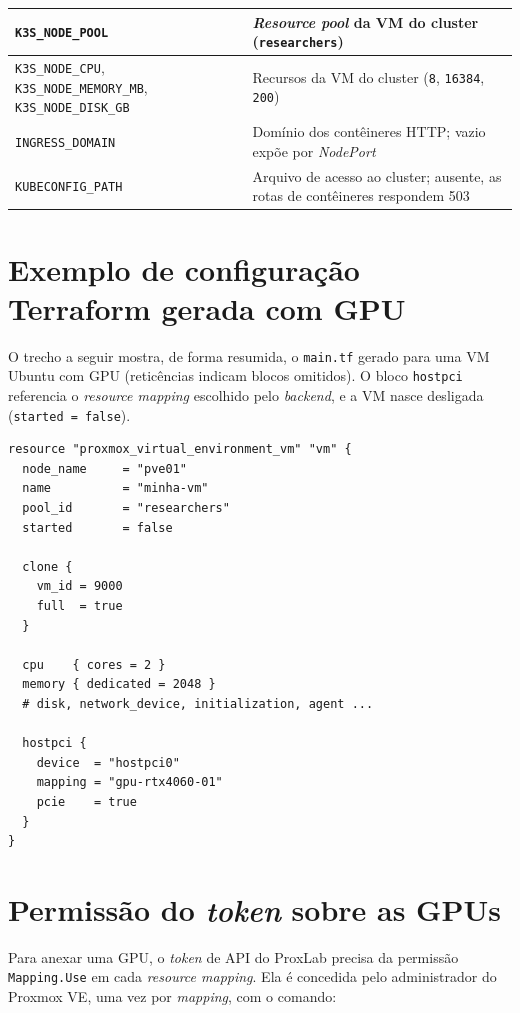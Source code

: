 \begin{longtable}{|p{6.2cm}|p{8.4cm}|}
    \texttt{K3S\_NODE\_POOL} & \textit{Resource pool} da VM do cluster (\texttt{researchers}) \\ \hline
    \texttt{K3S\_NODE\_CPU}, \texttt{K3S\_NODE\_MEMORY\_MB}, \texttt{K3S\_NODE\_DISK\_GB} & Recursos da VM do cluster (\texttt{8}, \texttt{16384}, \texttt{200}) \\ \hline
    \texttt{INGRESS\_DOMAIN} & Domínio dos contêineres HTTP; vazio expõe por \textit{NodePort} \\ \hline
    \texttt{KUBECONFIG\_PATH} & Arquivo de acesso ao cluster; ausente, as rotas de contêineres respondem 503 \\ \hline
\end{longtable}

\section{Exemplo de configuração Terraform gerada com GPU}

O trecho a seguir mostra, de forma resumida, o \texttt{main.tf} gerado para uma VM Ubuntu com GPU (reticências indicam blocos omitidos). O bloco \texttt{hostpci} referencia o \textit{resource mapping} escolhido pelo \textit{backend}, e a VM nasce desligada (\texttt{started = false}).

\medskip
\noindent\begin{minipage}{\textwidth}
\footnotesize
\begin{verbatim}
resource "proxmox_virtual_environment_vm" "vm" {
  node_name     = "pve01"
  name          = "minha-vm"
  pool_id       = "researchers"
  started       = false

  clone {
    vm_id = 9000
    full  = true
  }

  cpu    { cores = 2 }
  memory { dedicated = 2048 }
  # disk, network_device, initialization, agent ...

  hostpci {
    device  = "hostpci0"
    mapping = "gpu-rtx4060-01"
    pcie    = true
  }
}
\end{verbatim}
\end{minipage}
\medskip

\section{Permissão do \textit{token} sobre as GPUs}

Para anexar uma GPU, o \textit{token} de API do ProxLab precisa da permissão \texttt{Mapping.Use} em cada \textit{resource mapping}. Ela é concedida pelo administrador do Proxmox VE, uma vez por \textit{mapping}, com o comando:

